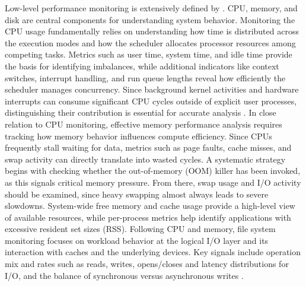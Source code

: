 Low-level performance monitoring is extensively defined by \cite{gregg2020bpf}.
CPU, memory, and disk are central components for understanding system behavior. Monitoring the CPU usage fundamentally relies on understanding how time is distributed across the execution modes and how the scheduler allocates processor resources among competing tasks. Metrics such as user time, system time, and idle time provide the basis for identifying imbalances, while additional indicators like context switches, interrupt handling, and run queue lengths reveal how efficiently the scheduler manages concurrency. Since background kernel activities and hardware interrupts can consume significant CPU cycles outside of explicit user processes, distinguishing their contribution is essential for accurate analysis \cite{gregg2020bpf}.
In close relation to CPU monitoring, effective memory performance analysis requires tracking how memory behavior influences compute efficiency. Since CPUs frequently stall waiting for data, metrics such as page faults, cache misses, and swap activity can directly translate into wasted cycles. A systematic strategy begins with checking whether the out-of-memory (OOM) killer has been invoked, as this signals critical memory pressure. From there, swap usage and I/O activity should be examined, since heavy swapping almost always leads to severe slowdowns. System-wide free memory and cache usage provide a high-level view of available resources, while per-process metrics help identify applications with excessive resident set sizes (RSS).
Following CPU and memory, file system monitoring focuses on workload behavior at the logical I/O layer and its interaction with caches and the underlying devices. Key signals include operation mix and rates such as reads, writes, opens/closes and latency distributions for I/O, and the balance of synchronous versus asynchronous writes \cite{gregg2020bpf}.

